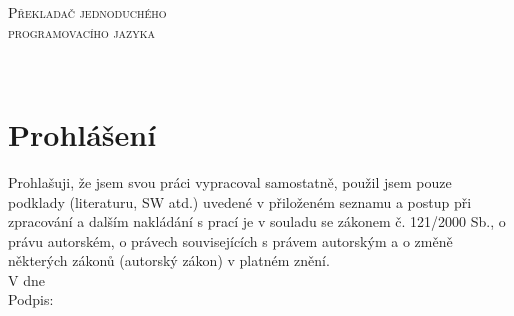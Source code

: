 
\begin{center}
\textsc{\Huge Překladač jednoduchého\\programovacího jazyka}\\[0.5cm]
\end{center}

\thispagestyle{empty}
\cleardoublepage

~\\[7cm]
\section*{Prohlášení}

Prohlašuji, že jsem svou práci vypracoval samostatně, použil jsem pouze
podklady (literaturu, SW atd.) uvedené v přiloženém seznamu a postup při
zpracování a dalším nakládání s prací je v souladu se zákonem č. 121/2000 Sb.,
o právu autorském, o právech souvisejících s právem autorským a o změně
některých zákonů (autorský zákon) v platném znění.\\[1.5cm]

V \makebox[6cm]{\dotfill} dne \makebox[6cm]{\dotfill}\\[4cm]

Podpis: \makebox[12cm]{\dotfill}

\newpage
